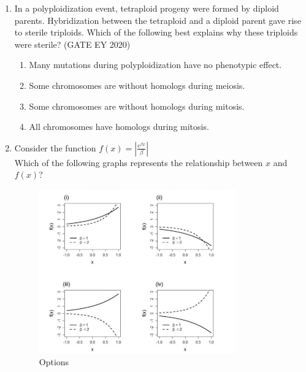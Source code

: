 \begin{enumerate}
\begin{multicols}{2}
\begin{enumerate}
\item P has a higher mean than Q; Q has a higher variance than P.
\item P has a higher mean than Q; P has a higher variance than Q.
\item P and Q have the same mean; Q has a higher variance than P.
\item P and Q have the same mean; P has a higher variance than Q.
\end{enumerate}
\end{multicols}
\item
In a polyploidization event, tetraploid progeny were formed by diploid parents. Hybridization between the tetraploid and a diploid parent gave rise to sterile triploids. Which of the following best explains why these triploids were sterile? \hfill {(GATE EY 2020)}
\begin{multicols}{2}
\begin{enumerate}
\item Many mutations during polyploidization have no phenotypic effect.
\item Some chromosomes are without homologs during meiosis.
\item Some chromosomes are without homologs during mitosis.
\item All chromosomes have homologs during mitosis.
\end{enumerate}
\end{multicols}

\item Consider the function $f(x) = \left| \frac{e^{\beta x}}{\beta} \right|$ \\
Which of the following graphs represents the relationship between $x$ and $f(x)$?

\begin{figure}[H]
\centering
    \includegraphics[width=0.8\textwidth]{figs/fig12.png}
\caption{Options}
\label{fig:q48}
\end{figure}


\end{enumerate}
